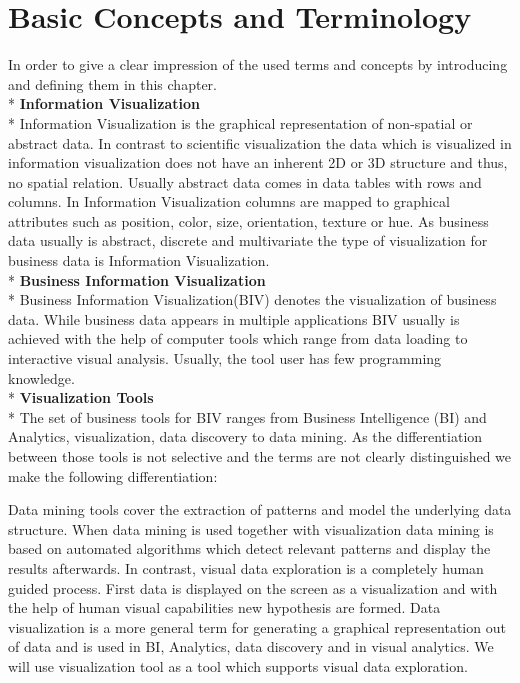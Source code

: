 \chapter{Basic Concepts and Terminology}
\label{concepts}
In order to give a clear impression of the used terms and concepts by introducing and defining them in this chapter.\\*
\textbf{Information Visualization}\\*
Information Visualization is the graphical representation of non-spatial or abstract data\cite{Keim}. In contrast to scientific visualization the data which is visualized in information visualization does not have an inherent 2D or 3D structure\cite{Shneiderman2008} and thus, no spatial relation. Usually abstract data comes in data tables with rows and columns. In Information Visualization columns are mapped to graphical attributes such as position, color, size, orientation, texture or hue. 
As business data usually is abstract, discrete and multivariate\cite{Tegarden1999} the type of visualization for business data is Information Visualization.\\*
\textbf{Business Information Visualization}\label{BIV}\\*
Business Information Visualization(BIV) denotes the visualization of business data. While business data appears in multiple applications BIV usually is achieved with the help of computer tools which range from data loading to interactive visual analysis. Usually, the tool user has few programming knowledge. \\*
\textbf{Visualization Tools}\label{tools}\\*
The set of business tools for BIV ranges from Business Intelligence (BI) and Analytics, visualization, data discovery to data mining. As the differentiation between those tools is not selective and the terms are not clearly distinguished we make the following differentiation:

Data mining tools cover the extraction of patterns and model the underlying data structure\cite{FerreiradeOliveira2003}. When data mining is used together with visualization data mining is based on automated algorithms which detect relevant patterns and display the results afterwards. In contrast, visual data exploration is a completely human guided process\cite{FerreiradeOliveira2003}. First data is displayed on the screen as a visualization and with the help of human visual capabilities new hypothesis are formed. Data visualization is a more general term for generating a graphical representation out of data and is used in BI, Analytics, data discovery and in visual analytics. We will use visualization tool as a tool which supports visual data exploration. 


